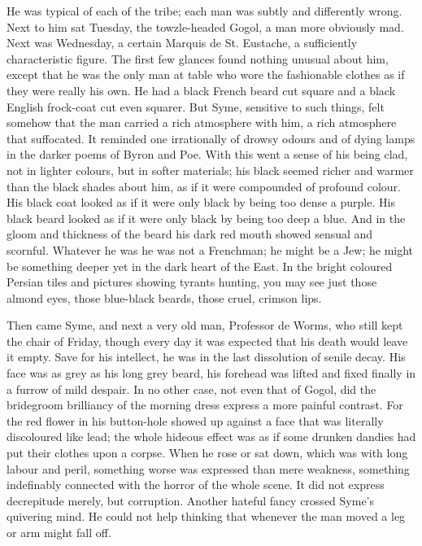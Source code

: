 \documentclass{book}
\begin{document}
He was typical of each of the tribe; each man was subtly and differently wrong. Next to him sat Tuesday, the towzle-headed Gogol, a man more obviously mad. Next was Wednesday, a certain Marquis de St. Eustache, a sufficiently characteristic figure. The first few glances found nothing unusual about him, except that he was the only man at table who wore the fashionable clothes as if they were really his own. He had a black French beard cut square and a black English frock-coat cut even squarer. But Syme, sensitive to such things, felt somehow that the man carried a rich atmosphere with him, a rich atmosphere that suffocated. It reminded one irrationally of drowsy odours and of dying lamps in the darker poems of Byron and Poe. With this went a sense of his being clad, not in lighter colours, but in softer materials; his black seemed richer and warmer than the black shades about him, as if it were compounded of profound colour. His black coat looked as if it were only black by being too dense a purple. His black beard looked as if it were only black by being too deep a blue. And in the gloom and thickness of the beard his dark red mouth showed sensual and scornful. Whatever he was he was not a Frenchman; he might be a Jew; he might be something deeper yet in the dark heart of the East. In the bright coloured Persian tiles and pictures showing tyrants hunting, you may see just those almond eyes, those blue-black beards, those cruel, crimson lips.

Then came Syme, and next a very old man, Professor de Worms, who still kept the chair of Friday, though every day it was expected that his death would leave it empty. Save for his intellect, he was in the last dissolution of senile decay. His face was as grey as his long grey beard, his forehead was lifted and fixed finally in a furrow of mild despair. In no other case, not even that of Gogol, did the bridegroom brilliancy of the morning dress express a more painful contrast. For the red flower in his button-hole showed up against a face that was literally discoloured like lead; the whole hideous effect was as if some drunken dandies had put their clothes upon a corpse. When he rose or sat down, which was with long labour and peril, something worse was expressed than mere weakness, something indefinably connected with the horror of the whole scene. It did not express decrepitude merely, but corruption. Another hateful fancy crossed Syme’s quivering mind. He could not help thinking that whenever the man moved a leg or arm might fall off.
\end{document}
